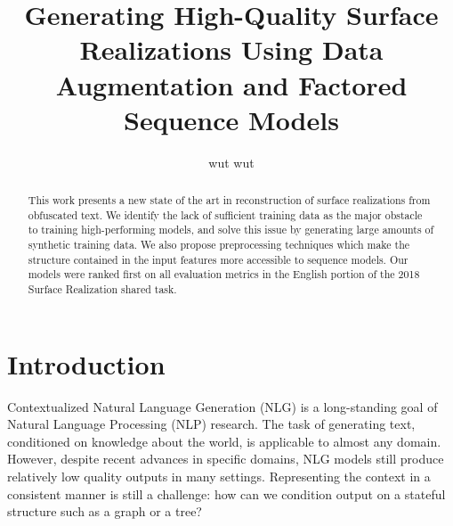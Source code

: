 \documentclass[11pt,a4paper]{article}
\title{Generating High-Quality Surface Realizations Using Data Augmentation and Factored Sequence Models}
\author{wut wut}
\date{}
\begin{document}
\maketitle
\begin{abstract}
This work presents a new state of the art in reconstruction of surface realizations from obfuscated text. We identify the lack of sufficient training data as the major obstacle to training high-performing models, and solve this issue by generating large amounts of synthetic training data. We also propose preprocessing techniques which make the structure contained in the input features more accessible to sequence models. Our models were ranked first on all evaluation metrics in the English portion  of the 2018 Surface Realization shared task. 


\end{abstract}

\section{Introduction}







Contextualized Natural Language Generation (NLG) is a long-standing goal of Natural Language Processing (NLP) research. The task of generating text, conditioned on knowledge about the world, is applicable to almost any domain. However, despite recent advances in specific domains, NLG models still produce relatively low quality outputs in many settings. Representing the context in a consistent manner is still a challenge: how can we condition output on a stateful structure such as a graph or a tree?
\end{document}
